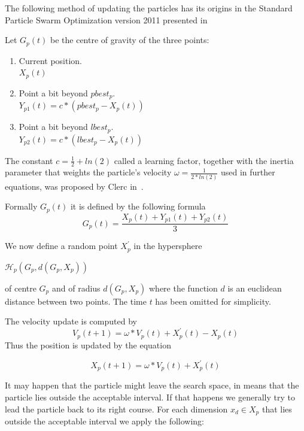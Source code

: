 \documentclass{mini}
\begin{document}
The following method of updating the particles has its origins in the Standard Particle Swarm Optimization version 2011 presented in~\cite{pso_11}

Let $G_p(t)$ be the centre of gravity of the three points:
\begin{enumerate}
    \item Current position. \\
    $X_p(t)$
    
    \item Point a bit beyond $pbest_p$. \\
    $Y_{p1}(t) = c*(pbest_p-X_p(t))$
    
    \item Point a bit beyond $lbest_p$. \\
    $Y_{p2}(t) = c*(lbest_p-X_p(t))$
    
\end{enumerate}

The constant $c = \frac{1}{2} + ln(2)$ called a learning factor, together with the inertia parameter that weights the particle's velocity $\omega = \frac{1}{2 * ln(2)}$ used in further equations, was proposed by Clerc in~\cite{pso_anal}.

Formally $G_p(t)$ it is defined by the following formula 
\begin{equation}
    G_p(t) = \frac{X_p(t) + Y_{p1}(t) + Y_{p2}(t)} {3}
\end{equation}

We now define a random point $X^{'}_p$ in the hypersphere
\begin{center}
    $\mathcal{H}_p(G_p, d(G_p, X_p))$ 
\end{center}
of centre $G_p$ and of radius $d(G_p, X_p)$ where the function $d$ is an euclidean distance between two points. The time $t$ has been omitted for simplicity.

The velocity update is computed by
\begin{equation}
    V_p(t+1) = \omega * V_p(t) + X^{'}_p(t) - X_p(t)
\end{equation}
Thus the position is updated by the equation

\begin{equation}
    X_p(t+1) = \omega * V_p(t) + X^{'}_p(t)
\end{equation}


It may happen that the particle might leave the search space, in means that the particle lies outside the acceptable interval. If that happens we generally try to lead the particle back to its right course. For each dimension $x_{d} \in X_p$ that lies  outside the acceptable interval we apply the following:
\end{document}
